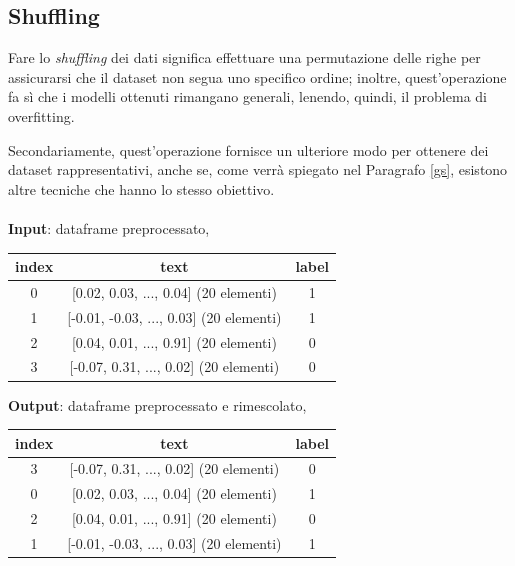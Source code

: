 \documentclass[12pt]{report}
\theoremstyle{definition}
\begin{document}
\subsection{Shuffling}
Fare lo \textit{shuffling} dei dati significa effettuare una permutazione delle righe per assicurarsi che il dataset non segua uno specifico ordine; inoltre, quest'operazione fa sì che i modelli ottenuti rimangano generali, lenendo, quindi, il problema di overfitting.

Secondariamente, quest'operazione fornisce un ulteriore modo per ottenere dei dataset rappresentativi, anche se, come verrà spiegato nel Paragrafo \ref{gs}, esistono altre tecniche che hanno lo stesso obiettivo. 
\\
\\
\textbf{Input}: dataframe preprocessato,
\begin{center}
    \begin{tabular}{|c|c|c|}
    \hline
    \textbf{index} & \textbf{text} & \textbf{label} \\
    \hline
         0 & [0.02, 0.03, ..., 0.04] (20 elementi) & 1 \\
         1 & [-0.01, -0.03, ..., 0.03] (20 elementi) & 1 \\
         2 & [0.04, 0.01, ..., 0.91] (20 elementi) & 0 \\
         3 & [-0.07, 0.31, ..., 0.02] (20 elementi) & 0 \\
    \hline
    \end{tabular}
\end{center}
\textbf{Output}: dataframe preprocessato e rimescolato,
\begin{center}
    \begin{tabular}{|c|c|c|}
    \hline
    \textbf{index} & \textbf{text} & \textbf{label} \\
    \hline
        3 & [-0.07, 0.31, ..., 0.02] (20 elementi) & 0 \\
        0 & [0.02, 0.03, ..., 0.04] (20 elementi) & 1 \\
        2 & [0.04, 0.01, ..., 0.91] (20 elementi) & 0 \\
        1 & [-0.01, -0.03, ..., 0.03] (20 elementi) & 1 \\
    \hline
    \end{tabular}
\end{center}

\end{document}
